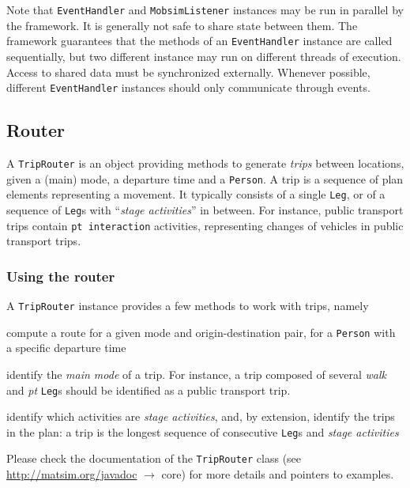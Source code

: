 Note that \lstinline|EventHandler| and \lstinline|MobsimListener| instances may be run in parallel by
the framework. It is generally not safe to share state between them. The framework guarantees that 
the methods of an \lstinline|EventHandler| instance are called sequentially, but two different instance
may run on different threads of execution. Access to shared data must be synchronized externally. Whenever
possible, different \lstinline|EventHandler| instances should only communicate through events.

\subsection{Router}
\label{sec:router-extension-point}

A \lstinline{TripRouter} is an object providing methods to generate \emph{trips} between locations,
given a (main) mode, a departure time and a \lstinline{Person}.
A trip is a sequence of plan elements representing a movement.
It typically consists of a single \lstinline{Leg},
or of a sequence of \lstinline{Leg}s with ``\emph{stage activities}'' in between.
For instance, public transport trips
contain \lstinline{pt interaction} activities,
representing changes of vehicles in public transport trips.

\subsubsection{Using the router}

A \lstinline{TripRouter} instance provides a few methods to work with trips, namely
\begin{compactitem}
	\item compute a route for a given mode and origin-destination pair, for a \lstinline{Person} with a specific departure time
	\item identify the \emph{main mode} of a trip. For instance, a trip composed of several \emph{walk} and \emph{pt} \lstinline{Leg}s should be identified as a public transport trip.
	\item identify which activities are \emph{stage activities}, and, by extension,
		identify the trips in the plan: a trip is the longest sequence of consecutive
		\lstinline{Leg}s and \emph{stage activities}
\end{compactitem}

Please check the documentation of the \lstinline{TripRouter} class  (see \url{http://matsim.org/javadoc} $\to$ core) for more details and pointers to examples.

